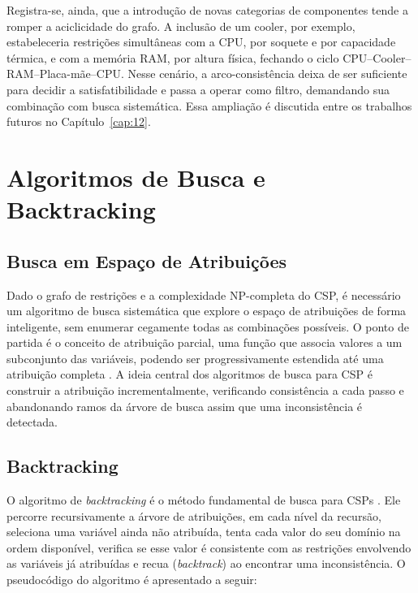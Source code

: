 Registra-se, ainda, que a introdução de novas categorias de componentes
tende a romper a aciclicidade do grafo. A inclusão de um cooler, por
exemplo, estabeleceria restrições simultâneas com a CPU, por soquete e por
capacidade térmica, e com a memória RAM, por altura física, fechando o ciclo
CPU--Cooler--RAM--Placa-mãe--CPU. Nesse cenário, a arco-consistência deixa
de ser suficiente para decidir a satisfatibilidade e passa a operar como
filtro, demandando sua combinação com busca sistemática. Essa ampliação é
discutida entre os trabalhos futuros no Capítulo~\ref{cap:12}.

\section{Algoritmos de Busca e Backtracking}
\label{sec:backtracking}

\subsection{Busca em Espaço de Atribuições}
Dado o grafo de restrições e a complexidade NP-completa do CSP, é necessário um algoritmo
de busca sistemática que explore o espaço de atribuições de forma inteligente,
sem enumerar cegamente todas as combinações possíveis. O ponto de partida é o conceito
de atribuição parcial, uma função que associa valores a um subconjunto das variáveis,
podendo ser progressivamente estendida até uma atribuição completa \cite{Russell2010}.
A ideia central dos algoritmos de busca para CSP é construir a atribuição incrementalmente,
verificando consistência a cada passo e abandonando ramos da árvore de busca assim que
uma inconsistência é detectada.

\subsection{Backtracking}
O algoritmo de \textit{backtracking} é o método fundamental de busca para CSPs \cite{Russell2010,Kumar1992}.
Ele percorre recursivamente a árvore de atribuições, em cada nível da recursão, seleciona uma variável
ainda não atribuída, tenta cada valor do seu domínio na ordem disponível, verifica se esse valor é consistente
com as restrições envolvendo as variáveis já atribuídas e recua (\textit{backtrack}) ao encontrar uma inconsistência.
O pseudocódigo do algoritmo é apresentado a seguir:

